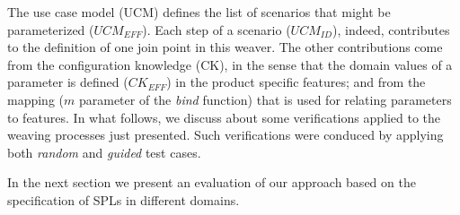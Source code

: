 \documentclass{acm_proc_article-sp}
\begin{document}
The use case model (UCM) defines the list of scenarios that might be parameterized ($UCM_{EFF}$). Each step of a scenario ($UCM_{ID}$), indeed, contributes to the definition of one join point in this weaver. The 
other contributions come from the configuration knowledge (CK), in the sense that the domain values 
of a parameter is defined ($CK_{EFF}$) in the product specific features; and from the mapping ($m$ parameter of the \emph{bind} function) that is used for relating parameters to features. 
In what follows, we discuss about some verifications applied to the weaving processes just presented. Such verifications were conduced by applying both \emph{random} and \emph{guided} test cases.

In the next section we present an evaluation of our approach based on the
specification of SPLs in different domains.
\end{document}
